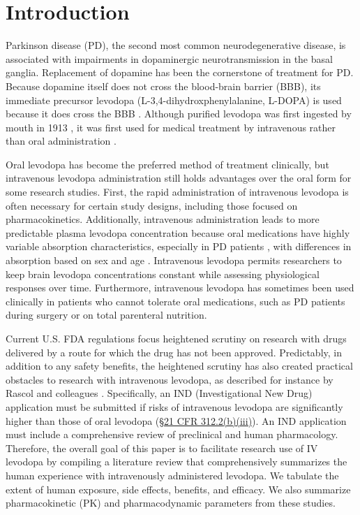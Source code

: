 \section{Introduction}
Parkinson disease (PD), the second most common neurodegenerative disease, is associated with impairments in dopaminergic neurotransmission in the basal ganglia. Replacement of dopamine has been the cornerstone of treatment for PD. Because dopamine itself does not cross the blood-brain barrier (BBB), its immediate precursor levodopa (L-3,4-dihydroxphenylalanine, L-DOPA) is used because it does cross the BBB \cite{11763859,13954967,5334614}. Although purified levodopa was first ingested by mouth in 1913 \cite{Roe_1997}, it was first used for medical treatment by intravenous rather than oral administration \cite{14430381,11763859}.
	
Oral levodopa has become the preferred method of treatment clinically, but intravenous levodopa administration still holds advantages over the oral form for some research studies.  First, the rapid administration of intravenous levodopa is often necessary for certain study designs, including those focused on pharmacokinetics.  Additionally, intravenous administration leads to more predictable plasma levodopa concentration because oral medications have highly variable absorption characteristics, especially in PD patients \cite{2797454}, with differences in absorption based on sex and age \cite{2775615,12011296}.  Intravenous levodopa permits researchers to keep brain levodopa concentrations constant while assessing physiological responses over time.  Furthermore, intravenous levodopa has sometimes been used clinically in patients who cannot tolerate oral medications, such as PD patients during surgery or on total parenteral nutrition.  

Current U.S. FDA regulations focus heightened scrutiny on research with drugs delivered by a route for which the drug has not been approved. Predictably, in addition to any safety benefits, the heightened scrutiny has also created practical obstacles to research with intravenous levodopa, as described for instance by Rascol and colleagues \cite[p. 250]{11176963}.  Specifically, an IND (Investigational New Drug) application must be submitted if risks of intravenous levodopa are significantly higher than those of oral levodopa (\href{http://www.accessdata.fda.gov/scripts/cdrh/cfdocs/cfcfr/CFRSearch.cfm?fr=312.2}{\S 21 CFR 312.2(b)(iii)}). An IND application must include a comprehensive review of preclinical and human pharmacology. Therefore, the overall goal of this paper is to facilitate research use of IV levodopa by compiling a literature review that comprehensively summarizes the human experience with intravenously administered levodopa.  We tabulate the extent of human exposure, side effects, benefits, and efficacy.  We also summarize pharmacokinetic (PK) and pharmacodynamic parameters from these studies. 
